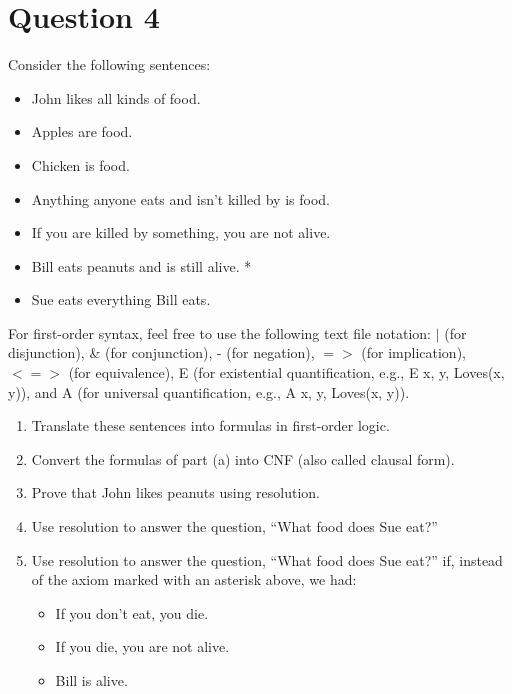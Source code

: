\documentclass[13pt]{article}
\begin{document}
\newpage
\section*{Question 4} Consider the following sentences:
\begin{itemize}
\item John likes all kinds of food.
\item Apples are food.
\item Chicken is food.
\item Anything anyone eats and isn’t killed by is food.
\item If you are killed by something, you are not alive.
\item Bill eats peanuts and is still alive. *
\item Sue eats everything Bill eats.
\end{itemize}
For first-order syntax, feel free to use the following text file notation: $|$ (for disjunction), \& (for conjunction), - (for negation), $=>$ (for implication), $<=>$ (for equivalence), E (for existential quantification,
e.g., E x, y, Loves(x, y)), and A (for universal quantification, e.g., A x, y, Loves(x, y)).
\begin{enumerate}[label=(\alph*)]
\item Translate these sentences into formulas in first-order logic.
\item Convert the formulas of part (a) into CNF (also called clausal form).
\item Prove that John likes peanuts using resolution.
\item Use resolution to answer the question, “What food does Sue eat?”
\item Use resolution to answer the question, “What food does Sue eat?” if, instead of the axiom marked
  with an asterisk above, we had:
  \begin{itemize}
  \item If you don’t eat, you die.
  \item If you die, you are not alive.
  \item Bill is alive.  
  \end{itemize}
\end{enumerate}
\end{document}
